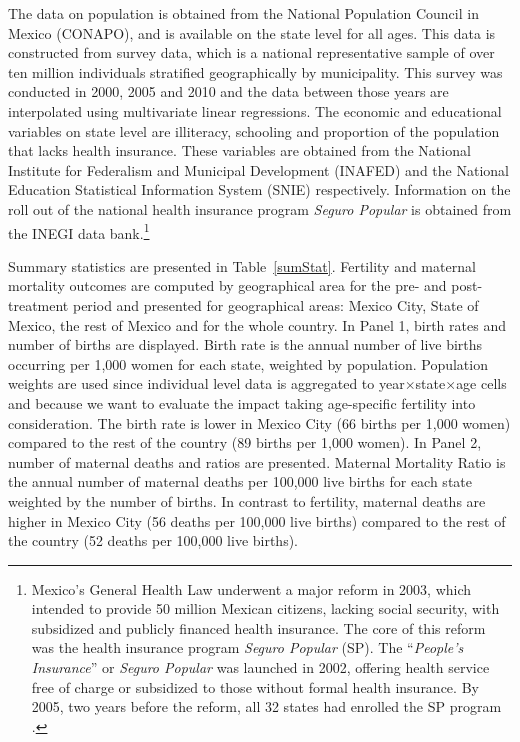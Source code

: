 \documentclass[a4paper, 11pt]{article}
\begin{document}
\begin{spacing}{2}
The data on population is obtained from the National Population Council in Mexico (CONAPO), and is available on the state level for all ages. This data is constructed from survey data, which is a national representative sample of over ten million individuals stratified geographically by municipality. This survey was conducted in 2000, 2005 and 2010 and the data between those years are interpolated using multivariate linear regressions. The economic and educational variables on state level are illiteracy, schooling and proportion of the population that lacks health insurance. These variables are obtained from the National Institute for Federalism and Municipal Development (INAFED) and the National Education Statistical Information System (SNIE) respectively. Information on the roll out of the national health insurance program \textit{Seguro Popular} is obtained from the INEGI data bank.\footnote{Mexico's General Health Law underwent a major reform in 2003, which intended to provide 50 million Mexican citizens, lacking social security, with subsidized and publicly financed health insurance. The core of this reform was the health insurance program \textit{Seguro Popular} (SP). The ``\textit{People’s Insurance}'' or \textit{Seguro Popular} was launched in 2002, offering health service free of charge or subsidized to those without formal health insurance. By 2005, two years before the reform, all 32 states had enrolled the SP program \citep{knaul__2007}.}   


Summary statistics are presented in Table~\ref{sumStat}. Fertility and maternal mortality outcomes are computed by geographical area for the pre- and post-treatment period and presented for geographical areas: Mexico City, State of Mexico, the rest of Mexico and for the whole country. In Panel 1, birth rates and number of births are displayed. Birth rate is the annual number of live births occurring per 1,000 women for each state, weighted by population. Population weights are used since individual level data is aggregated to year$\times$state$\times$age cells and because we want to evaluate the impact taking age-specific fertility into consideration. The birth rate is lower in Mexico City (66 births per 1,000 women) compared to the rest of the country (89 births per 1,000 women). In Panel 2, number of maternal deaths and ratios are presented. Maternal Mortality Ratio is the annual number of maternal deaths per 100,000 live births for each state weighted by the number of births. In contrast to fertility, maternal deaths are higher in Mexico City (56 deaths per 100,000 live births) compared to the rest of the country (52 deaths per 100,000 live births). 


\end{spacing}
\end{document}
